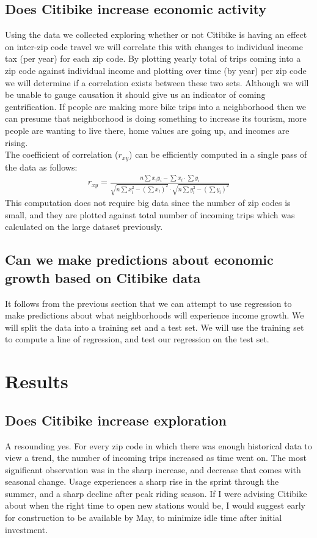 \documentclass{article}
\begin{document}
\subsection{Does Citibike increase economic activity}
Using the data we collected exploring whether or not Citibike is having an effect on inter-zip code travel we will correlate this with changes to individual income tax (per year) for each zip code. By plotting yearly total of trips coming into a zip code against individual income and plotting over time (by year) per zip code we will determine if a correlation exists between these two sets. Although we will be unable to gauge causation it should give us an indicator of coming gentrification. If people are making more bike trips into a neighborhood then we can presume that neighborhood is doing something to increase its tourism, more people are wanting to live there, home values are going up, and incomes are rising.\\
The coefficient of correlation ($r_{xy}$) can be efficiently computed in a single pass of the data as follows:
\begin{align*}
r_{xy} = \frac{n\sum{x_{i}y_{i}} - \sum{x_i}\cdot\sum{y_i}}{\sqrt{n\sum{x^2_i}-(\sum{x_i})^2}\cdot \sqrt{n\sum{y^2_i}-(\sum{y_i})^2}}
\end{align*}
This computation does not require big data since the number of zip codes is small, and they are plotted against total number of incoming trips which was calculated on the large dataset previously.

\subsection{Can we make predictions about economic growth based on Citibike data}
It follows from the previous section that we can attempt to use regression to make predictions about what neighborhoods will experience income growth. We will split the data into a training set and a test set. We will use the training set to compute a line of regression, and test our regression on the test set.


\section{Results}
\subsection{Does Citibike increase exploration}
A resounding yes. For every zip code in which there was enough historical data to view a trend, the number of incoming trips increased as time went on. The most significant observation was in the sharp increase, and decrease that comes with seasonal change. Usage experiences a sharp rise in the sprint through the summer, and a sharp decline after peak riding season. If I were advising Citibike about when the right time to open new stations would be, I would suggest early for construction to be available by May, to minimize idle time after initial investment.
\end{document}
